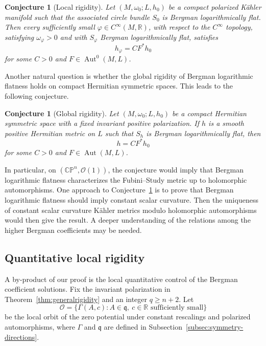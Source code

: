 \documentclass[11pt,reqno]{amsart}
\theoremstyle{corollary}
\theoremstyle{conjecture}
\newtheorem{conjecture}[theorem]{Conjecture}
\theoremstyle{assumption}
\theoremstyle{proposition}
\theoremstyle{remark}
\numberwithin{equation}{section}
\begin{document}
\begin{conjecture}[Local rigidity]\label{conj:local-rigidity}
Let $(M,\omega_0;L,h_0)$ be a compact polarized K\"ahler manifold such that the associated circle bundle $S_0$ is Bergman logarithmically flat. Then every sufficiently small $\varphi\in C^\infty(M,\mathbb R)$, with respect to the $C^\infty$ topology, satisfying $\omega_\varphi>0$ and with $S_\varphi$ Bergman logarithmically flat, satisfies
\[
h_\varphi=CF^*h_0
\]
for some $C>0$ and $F\in\operatorname{Aut}^0(M,L)$.
\end{conjecture}

Another natural question is whether the global rigidity of Bergman logarithmic flatness holds on compact Hermitian symmetric spaces. This leads to the following conjecture.

\begin{conjecture}[Global rigidity]\label{conj:global-rigidity}
Let $(M,\omega_0;L,h_0)$ be a compact Hermitian symmetric space with a fixed invariant positive polarization. If $h$ is a smooth positive Hermitian metric on $L$ such that $S_h$ is Bergman logarithmically flat, then
\[
h=CF^*h_0
\]
for some $C>0$ and $F\in\operatorname{Aut}(M,L)$.
\end{conjecture}

In particular, on $(\mathbb{CP}^n,\mathcal O(1))$, the conjecture would imply that Bergman logarithmic flatness characterizes the Fubini--Study metric up to holomorphic automorphisms. One approach to Conjecture~\ref{conj:global-rigidity} is to prove that Bergman logarithmic flatness should imply constant scalar curvature. Then the uniqueness of constant scalar curvature K\"ahler metrics modulo holomorphic automorphisms \cite{BermanBerndtsson2017} would then give the result. A deeper understanding of the relations among the higher Bergman coefficients may be needed.


\subsection{Quantitative local rigidity}
\label{subsec:Quantitative local rigidity}

A by-product of our proof is the local quantitative control of the Bergman coefficient solutions. Fix the invariant polarization in Theorem~\ref{thm:generalrigidity} and an integer $q\geq n+2$. Let
\[
\mathcal O=\{\Gamma(A,c)\colon A\in\mathfrak q,\ c\in\mathbb R
\text{ sufficiently small}\}
\]
be the local orbit of the zero potential under constant rescalings and polarized automorphisms, where $\Gamma$ and $\mathfrak q$ are defined in Subsection~\ref{subsec:symmetry-directions}.
\end{document}
